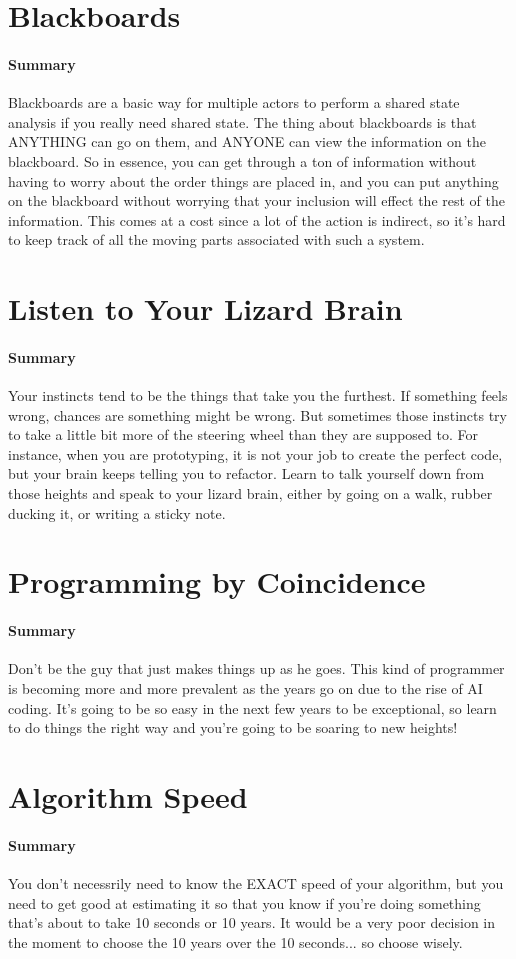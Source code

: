 \documentclass{article}
\begin{document}
\section{Blackboards}
        \paragraph{Summary} Blackboards are a basic way for multiple actors to perform a shared state analysis if you really need shared state. The thing about blackboards is that ANYTHING can go on them, and ANYONE can view the information on the blackboard. So in essence, you can get through a ton of information without having to worry about the order things are placed in, and you can put anything on the blackboard without worrying that your inclusion will effect the rest of the information. This comes at a cost since a lot of the action is indirect, so it's hard to keep track of all the moving parts associated with such a system.

\section{Listen to Your Lizard Brain}
    \paragraph{Summary} Your instincts tend to be the things that take you the furthest. If something feels wrong, chances are something might be wrong. But sometimes those instincts try to take a little bit more of the steering wheel than they are supposed to. For instance, when you are prototyping, it is not your job to create the perfect code, but your brain keeps telling you to refactor. Learn to talk yourself down from those heights and speak to your lizard brain, either by going on a walk, rubber ducking it, or writing a sticky note.

\section{Programming by Coincidence}
    \paragraph{Summary} Don't be the guy that just makes things up as he goes. This kind of programmer is becoming more and more prevalent as the years go on due to the rise of AI coding. It's going to be so easy in the next few years to be exceptional, so learn to do things the right way and you're going to be soaring to new heights!

\section{Algorithm Speed}
    \paragraph{Summary} You don't necessrily need to know the EXACT speed of your algorithm, but you need to get good at estimating it so that you know if you're doing something that's about to take 10 seconds or 10 years. It would be a very poor decision in the moment to choose the 10 years over the 10 seconds... so choose wisely.
\end{document}
